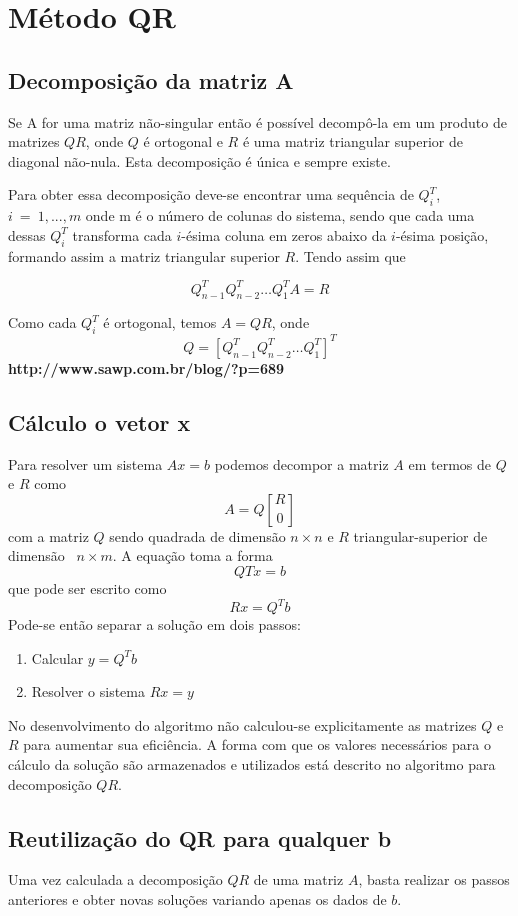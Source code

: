 \chapter{Método QR}

	\section{Decomposição da matriz A}
	Se A for uma matriz não-singular então é possível decompô-la em um produto de matrizes 
	$QR$, onde $Q$ é ortogonal e $R$ é uma matriz triangular superior de diagonal não-nula. Esta decomposição é única e sempre existe.
	
	Para obter essa decomposição deve-se encontrar uma sequência de $Q_i ^T$, $i~ =~ 1,...,m$ onde m é o número de colunas do sistema, sendo que cada uma dessas $Q_i^T$ transforma cada $i$-ésima coluna em zeros abaixo da $i$-ésima posição, formando assim a matriz triangular superior $R$. Tendo assim que
	
	\[Q_{n-1} ^TQ_{n-2} ^T \ldots Q_{1} ^T A = R\]
	
	Como cada $Q_i ^T$ é ortogonal, temos $A = QR$, onde \[Q = [Q_{n-1} ^T Q_{n-2} ^T \ldots Q_{1} ^T]^T \]\textbf{http://www.sawp.com.br/blog/?p=689}%
	\section{Cálculo o vetor x}
	Para resolver um sistema $Ax=b$ podemos decompor a matriz $A$ em termos de $Q$ e $R$ como \[ A = Q{R \brack 0}\] com a matriz $Q$ sendo quadrada de dimensão $n\times n$ e $R$ triangular-superior de dimensão~ $n\times m$.
	A equação toma a forma \[QTx = b\] que pode ser escrito como \[Rx=Q^Tb\]
	Pode-se então separar a solução em dois passos:
	\begin{enumerate}
	\item Calcular $y = Q^Tb$
	\item Resolver o sistema $Rx = y$
	\end{enumerate}
	
	No desenvolvimento do algoritmo não calculou-se explicitamente as matrizes $Q$ e $R$ para aumentar sua eficiência. A forma com que os valores necessários para o cálculo da solução são armazenados e utilizados está descrito no algoritmo para decomposição $QR$.
	
	\section{Reutilização do QR para qualquer b}
	Uma vez calculada a decomposição $QR$ de uma matriz $A$, basta realizar os passos anteriores e obter novas soluções variando apenas os dados de $b$.

